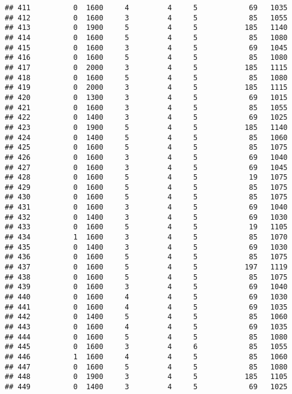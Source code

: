\documentclass[]{article}
\begin{document}
\begin{verbatim}
## 411          0  1600     4         4     5            69   1035
## 412          0  1600     3         4     5            85   1055
## 413          0  1900     5         4     5           185   1140
## 414          0  1600     5         4     5            85   1080
## 415          0  1600     3         4     5            69   1045
## 416          0  1600     5         4     5            85   1080
## 417          0  2000     3         4     5           185   1115
## 418          0  1600     5         4     5            85   1080
## 419          0  2000     3         4     5           185   1115
## 420          0  1300     3         4     5            69   1015
## 421          0  1600     3         4     5            85   1055
## 422          0  1400     3         4     5            69   1025
## 423          0  1900     5         4     5           185   1140
## 424          0  1400     5         4     5            85   1060
## 425          0  1600     5         4     5            85   1075
## 426          0  1600     3         4     5            69   1040
## 427          0  1600     3         4     5            69   1045
## 428          0  1600     5         4     5            19   1075
## 429          0  1600     5         4     5            85   1075
## 430          0  1600     5         4     5            85   1075
## 431          0  1600     3         4     5            69   1040
## 432          0  1400     3         4     5            69   1030
## 433          0  1600     5         4     5            19   1105
## 434          1  1600     3         4     5            85   1070
## 435          0  1400     3         4     5            69   1030
## 436          0  1600     5         4     5            85   1075
## 437          0  1600     5         4     5           197   1119
## 438          0  1600     5         4     5            85   1075
## 439          0  1600     3         4     5            69   1040
## 440          0  1600     4         4     5            69   1030
## 441          0  1600     4         4     5            69   1035
## 442          0  1400     5         4     5            85   1060
## 443          0  1600     4         4     5            69   1035
## 444          0  1600     5         4     5            85   1080
## 445          0  1600     3         4     6            85   1055
## 446          1  1600     4         4     5            85   1060
## 447          0  1600     5         4     5            85   1080
## 448          0  1900     3         4     5           185   1105
## 449          0  1400     3         4     5            69   1025

\end{verbatim}
\end{document}
